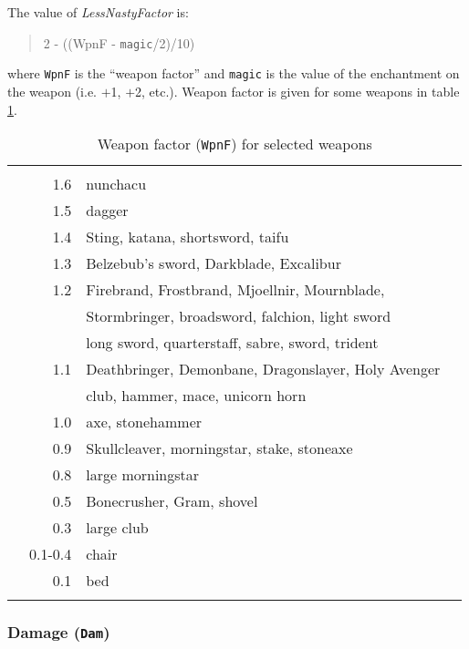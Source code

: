 The value of {\sl LessNastyFactor} is:
\begin{quote} 
2 - ((WpnF - {\tt magic}/2)/10) 
\end{quote}
where {\tt WpnF} is the ``weapon factor'' and {\tt magic} is the 
value of the enchantment on the weapon (i.e. $+$1, $+$2, etc.).
Weapon factor is given for some weapons
in table \ref{tab:weap_factor}. \\

\begin{table}
\begin{center}
\caption{Weapon factor ({\tt WpnF}) for selected weapons}\label{tab:weap_factor}  
\small
\vskip 12pt
\begin{tabular}{|crlc|} \hline 
	& & & \\
       &  1.6 & nunchacu &  \\
       &  1.5 & dagger & \\  
       &  1.4 & Sting, katana, shortsword, taifu & \\
       &  1.3 & Belzebub's sword, Darkblade, Excalibur & \\
       &  1.2 & Firebrand, Frostbrand, Mjoellnir, Mournblade, &  \\
       &      & Stormbringer, broadsword, falchion, light sword & \\
       &      & long sword, quarterstaff, sabre, sword, trident & \\
       &  1.1 & Deathbringer, Demonbane, Dragonslayer, Holy Avenger & \\
       &      & club, hammer, mace, unicorn horn & \\
       &  1.0 & axe, stonehammer & \\
       &  0.9 & Skullcleaver, morningstar, stake, stoneaxe & \\
       &  0.8 & large morningstar & \\
       &  0.5 & Bonecrusher, Gram, shovel & \\
       &  0.3 & large club &  \\    
       &  0.1-0.4 & chair & \\ 
       &  0.1 & bed & \\ 
	& & & \\ \hline 
\end{tabular}
\end{center}
\end{table}


\subsubsection{Damage ({\tt Dam})}

